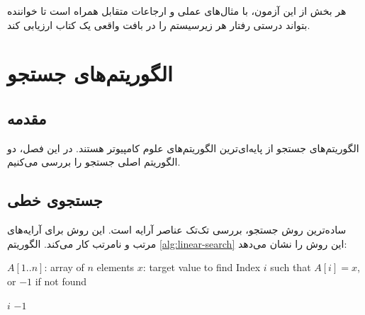 \documentclass{matinbook}
\begin{document}
هر بخش از این آزمون، با مثال‌های عملی و ارجاعات متقابل
همراه است تا خواننده بتواند درستی رفتار هر زیرسیستم را
در بافت واقعی یک کتاب ارزیابی کند.

\clearpage

\tableofcontents
\clearpage

\listoffigures
\clearpage

\listoftables
\clearpage

\listofalgorithms
\clearpage

\mainmatter
\mainmattergeometry

\chapter{الگوریتم‌های جستجو}
\label{chap:search}

\section{مقدمه}
\label{sec:search-intro}

الگوریتم‌های جستجو از پایه‌ای‌ترین
الگوریتم‌های علوم کامپیوتر هستند. در این فصل، دو
الگوریتم اصلی جستجو را بررسی می‌کنیم.


\section{جستجوی خطی}
\label{sec:search-linear}

ساده‌ترین روش جستجو، بررسی تک‌تک عناصر آرایه است.
این روش برای آرایه‌های مرتب و نامرتب کار می‌کند.
الگوریتم \cref{alg:linear-search} این روش را نشان می‌دهد:

\begin{latin}
\begin{algorithm}
\caption{جستجوی خطی}
\label{alg:linear-search}
\begin{algorithmic}[1]
    \Require $A[1..n]$: array of $n$ elements
    \Require $x$: target value to find
    \Ensure Index $i$ such that $A[i] = x$, or $-1$ if not found

            \State \Return $i$
        \EndIf
    \EndFor
    \State \Return $-1$
\end{algorithmic}
\end{algorithm}
\end{latin}
\end{document}
